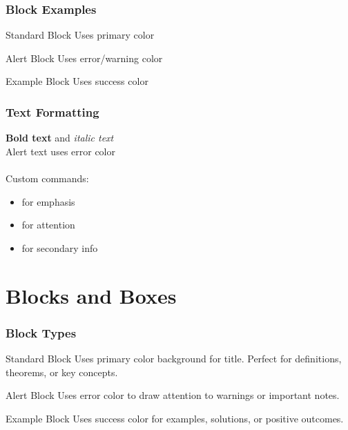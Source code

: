 \documentclass{beamer}
\begin{document}
\begin{frame}
\frametitle{Block Examples}

\begin{block}{Standard Block}
Uses primary color
\end{block}

\begin{alertblock}{Alert Block}
Uses error/warning color
\end{alertblock}

\begin{exampleblock}{Example Block}
Uses success color
\end{exampleblock}

\end{frame}

\begin{frame}
\frametitle{Text Formatting}

\textbf{Bold text} and \textit{italic text} \\
\alert{Alert text uses error color} \\
 \\

\vspace{1em}
Custom commands:
\begin{itemize}
    \item {} for emphasis
    \item {} for attention
    \item {} for secondary info
\end{itemize}
\end{frame}

\section{Blocks and Boxes}

\begin{frame}
\frametitle{Block Types}

\begin{block}{Standard Block}
Uses primary color background for title. Perfect for definitions, theorems, or key concepts.
\end{block}

\begin{alertblock}{Alert Block}
Uses error color to draw attention to warnings or important notes.
\end{alertblock}

\begin{exampleblock}{Example Block}
Uses success color for examples, solutions, or positive outcomes.
\end{exampleblock}

\end{frame}
\end{document}

